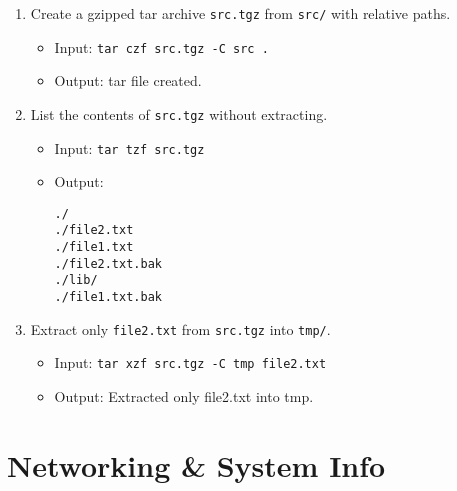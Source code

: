 \begin{enumerate}
\item Create a gzipped tar archive \texttt{src.tgz} from \texttt{src/} with relative paths.
\begin{itemize}
\item Input: \texttt{tar czf src.tgz -C src .}
\item Output: tar file created.
\end{itemize}

\item List the contents of \texttt{src.tgz} without extracting.
\begin{itemize}
\item Input: \texttt{tar tzf src.tgz}
\item Output:
\begin{verbatim}
./
./file2.txt
./file1.txt
./file2.txt.bak
./lib/
./file1.txt.bak
\end{verbatim}
\end{itemize}

\item Extract only \texttt{file2.txt} from \texttt{src.tgz} into \texttt{tmp/}.
\begin{itemize}
\item Input: \texttt{tar xzf src.tgz -C tmp file2.txt}
\item Output: Extracted only file2.txt into tmp.
\end{itemize}
\end{enumerate}

\section{Networking \& System Info}


